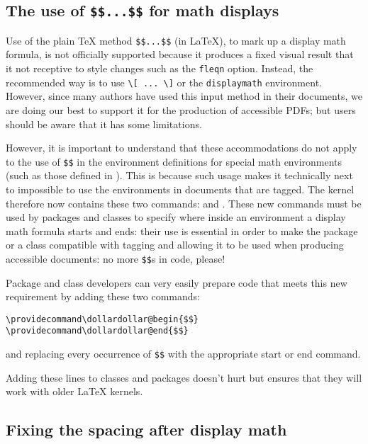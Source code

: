\documentclass{ltnews}
\providecommand\env[1]{\texttt{#1}}
\providecommand\env[1]{\texttt{#1}}
\begin{document}
\subsection{The use of \texttt{\$\$...\$\$} for math displays}

Use of the plain \TeX{} method \verb=$$...$$= (in \LaTeX{}), to mark up a
display math formula, is not officially supported because it produces a
fixed visual result that it not receptive to style changes such as the
\texttt{fleqn} option. Instead, the recommended way is to use
\verb=\[ ... \]= or the \env{displaymath} environment. However, since many
authors %
have used this input method in their documents, we are doing our best to
support it for the production of accessible PDFs; but users should be
aware that it has some limitations.

However, it is important to understand that these accommodations do not apply 
to the use of \verb=$$= in the environment definitions for special
math environments (such as those defined in ). 
This is because such usage makes it
technically next to %
impossible to use the environments in documents that are tagged.
%
The kernel therefore now contains these two commands:
 and .  These new commands
must be used by packages and classes to specify where
inside an environment
a display math
formula starts and ends: their use is essential in order to make the
package or a class compatible with tagging and allowing it to be used
when producing accessible documents: no more \texttt{\$\$}s
in code, please! 

Package and class developers can very easily prepare code that 
meets this new requirement by adding these two commands:
\begin{verbatim}
\providecommand\dollardollar@begin{$$}
\providecommand\dollardollar@end{$$}
\end{verbatim}
and replacing every occurrence of \verb=$$= with the appropriate start or
end command.

Adding these  lines to
classes and packages doesn't hurt but ensures that they will work with older \LaTeX{}
kernels.



\subsection{Fixing the spacing after display math}
\end{document}
